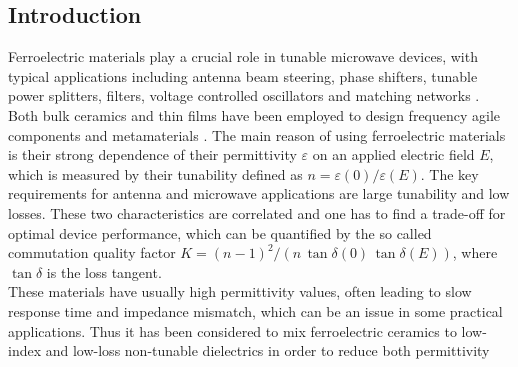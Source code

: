 \documentclass[openacc]{rsproca_new}%
\begin{document}
\begin{fmtext}
  \section{Introduction}


  Ferroelectric materials play a crucial role in tunable
  microwave devices, with typical applications including antenna beam steering,
  phase shifters, tunable power splitters, filters, voltage controlled oscillators and
  matching networks \cite{Tagantsev2018}. Both bulk ceramics and thin films have
  been employed to design frequency agile components \cite{vendik1999ferroelectric, lancaster1998thin,
  xi2000oxide} and metamaterials \cite{Hand2008, Zhao2008}. The main reason of using
  ferroelectric materials is their strong dependence of their permittivity $\varepsilon$
  on an applied electric field $E$, which is measured by their tunability defined as $n = \varepsilon(0)/\varepsilon(E)$.
  The key requirements for antenna and microwave applications are large tunability and low losses.
  These two characteristics are correlated and one has to find a trade-off for optimal device
  performance, which can be quantified by the so called commutation quality factor
  $K = (n -1)^2/(n\, \tan\delta(0)\,\tan\delta(E))$, where $\tan\delta$ is the loss tangent.\\
  These materials have usually high permittivity values,
  often leading to slow response time and impedance mismatch, which can be an issue in some practical
  applications. Thus it has been considered to mix ferroelectric ceramics to low-index and
  low-loss non-tunable dielectrics in order to reduce both permittivity
\end{fmtext}

\end{document}
